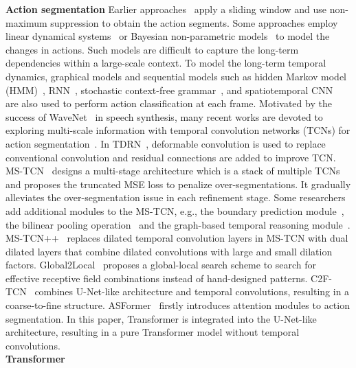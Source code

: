 \documentclass[letterpaper]{article} \usepackage[submission]{aaai23}  \usepackage{times}  \usepackage{helvet}  \usepackage{courier}  \usepackage[hyphens]{url}  \usepackage{graphicx} \urlstyle{rm} \def\UrlFont{\rm}  \usepackage{natbib}  \usepackage{caption} \frenchspacing  \setlength{\pdfpagewidth}{8.5in} \setlength{\pdfpageheight}{11in} \usepackage{algorithm}
\begin{document}
{\bf Action segmentation} \quad 
Earlier approaches~\cite{rohrbach2012database,karaman2014fast} apply a sliding window and use non-maximum suppression to obtain the action segments. Some approaches employ linear dynamical systems~\cite{bhattacharya2014recognition} or Bayesian non-parametric models~\cite{cheng2014temporal} to model the changes in actions. Such models are difficult to capture the long-term dependencies within a large-scale context. To model the long-term temporal dynamics, graphical models and sequential models such as hidden Markov model (HMM)~\cite{kuehne2016end,kuehne2017weakly}, RNN~\cite{richard2017weakly,singh2016multi}, stochastic context-free grammar~\cite{vo2014stochastic}, and spatiotemporal CNN~\cite{lea2016segmental} are also used to perform action classification at each frame. Motivated by the success of WaveNet~\cite{van2016wavenet} in speech synthesis, many recent works are devoted to exploring multi-scale information with temporal convolution networks (TCNs) for action segmentation~\cite{lea2017temporal}. In TDRN~\cite{lei2018temporal}, deformable convolution is used to replace conventional convolution and residual connections are added to improve TCN. MS-TCN~\cite{farha2019ms} designs a multi-stage architecture which is a stack of multiple TCNs and proposes the truncated MSE loss to penalize over-segmentations. It gradually alleviates the over-segmentation issue in each refinement stage. Some researchers add additional modules to the MS-TCN, e.g., the boundary prediction module~\cite{BCN}, the bilinear pooling operation~\cite{zhang2019low} and the graph-based temporal reasoning module~\cite{huang2020improving}. MS-TCN++~\cite{li2020ms} replaces dilated temporal convolution layers in MS-TCN with dual dilated layers that combine dilated convolutions with large and small dilation factors. Global2Local~\cite{gao2021global2local} proposes a global-local search scheme to search for effective receptive field combinations instead of hand-designed patterns. C2F-TCN~\cite{singhania2021coarse} combines U-Net-like architecture and temporal convolutions, resulting in a coarse-to-fine structure. ASFormer~\cite{ASFormer} firstly introduces attention modules to action segmentation. In this paper, Transformer is integrated into the U-Net-like architecture, resulting in a pure Transformer model without temporal convolutions.
\\
{\bf Transformer} \quad 
\end{document}
